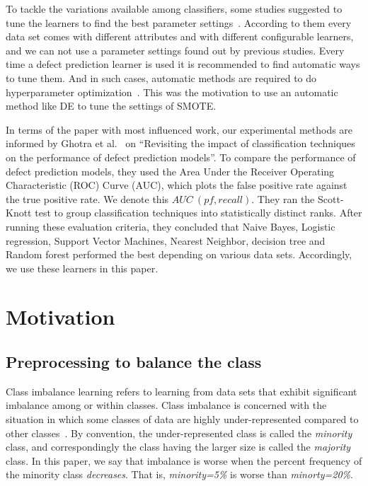 \documentclass[sigconf,review, anonymous]{acmart}
\theoremstyle{break}
\theoremstyle{break}
\begin{document}
To tackle the variations available among classifiers, some studies suggested to tune the learners to find the best parameter settings~\cite{tantithamthavorn2016automated, fu2016tuning}.  According to them every data set comes with different attributes and with different configurable learners, and we can not use a parameter settings found out by previous studies. Every time a defect prediction learner is used it is recommended to find automatic ways to tune them. And in such cases, automatic 
methods are required to do hyperparameter optimization~\cite{agrawal2016wrong, fu2016tuning}. This was the motivation to use an automatic method like DE to
tune the settings of SMOTE.

In terms of the paper with most influenced work,
our experimental methods are informed 
by  Ghotra et al.~\cite{ghotra2015revisiting} on ``Revisiting the impact of classification techniques on the performance of defect prediction models''. To 
compare  the  performance  of  defect prediction  models,  they  used  the  Area  Under  the Receiver Operating Characteristic (ROC) Curve (AUC), which plots  the  false  positive  rate  against  the  true  positive rate. We denote this $AUC\ (pf, recall)$. 
They ran the Scott-Knott test to group classification techniques into statistically distinct ranks. After running these evaluation criteria, they concluded that Naive Bayes, Logistic regression, Support Vector Machines, Nearest Neighbor, decision tree and Random forest performed the best depending on various data sets. Accordingly, 
we use these learners in this paper.

\section{Motivation}
\subsection{Preprocessing to balance the class}
\label{sect:motivation}

Class imbalance learning refers to learning from data sets that exhibit significant imbalance among or within classes. Class imbalance  is concerned with the situation in which some classes of data are
highly under-represented compared to other classes~\cite{he2009learning}. By convention,
the under-represented class is called the {\em minority} class,
and correspondingly the class having the larger size is called the
{\em majority} class. In this paper, we say that imbalance is worse when the percent frequency of
the minority class {\em decreases}. That is,
{\em minority=5\%} is worse than {\em minorty=20\%}.
\end{document}
